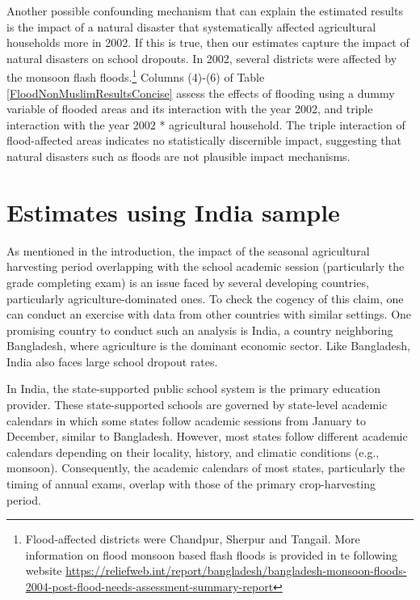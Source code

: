\documentclass[12pt,letterpaper]{article}\usepackage[margin=1in]{geometry}
\newcommand{\0}{\ensuremath{\mbox{\boldmath $0$}}}
\begin{document}
Another possible confounding mechanism that can explain the estimated results is the impact of a natural disaster that systematically affected agricultural households more in 2002. If this is true, then our estimates capture the impact of natural disasters on school dropouts. In 2002, several districts were affected by the monsoon flash floods.\footnote{Flood-affected districts were Chandpur, Sherpur and Tangail. More information on flood monsoon based flash floods is provided in te following website \url{https://reliefweb.int/report/bangladesh/bangladesh-monsoon-floods-2004-post-flood-needs-assessment-summary-report} } Columns (4)-(6) of Table \ref{FloodNonMuslimResultsConcise} assess the effects of flooding using a dummy variable of flooded areas and its interaction with the year 2002, and triple interaction with the year 2002 * agricultural household. The triple interaction of flood-affected areas indicates no statistically discernible impact, suggesting that natural disasters such as floods are not plausible impact mechanisms.


\section{Estimates using India sample}

As mentioned in the introduction, the impact of the seasonal agricultural harvesting period overlapping with the school academic session (particularly the grade completing exam) is an issue faced by several developing countries, particularly agriculture-dominated ones. To check the cogency of this claim, one can conduct an exercise with data from other countries with similar settings. One promising country to conduct such an analysis is India, a country neighboring Bangladesh, where agriculture is the dominant economic sector. Like Bangladesh, India also faces large school dropout rates.

In India, the state-supported public school system is the primary education provider. These state-supported schools are governed by state-level academic calendars in which some states follow academic sessions from January to December, similar to Bangladesh. However, most states follow different academic calendars depending on their locality, history, and climatic conditions (e.g., monsoon). Consequently, the academic calendars of most states, particularly the timing of annual exams, overlap with those of the primary crop-harvesting period. 
\end{document}
